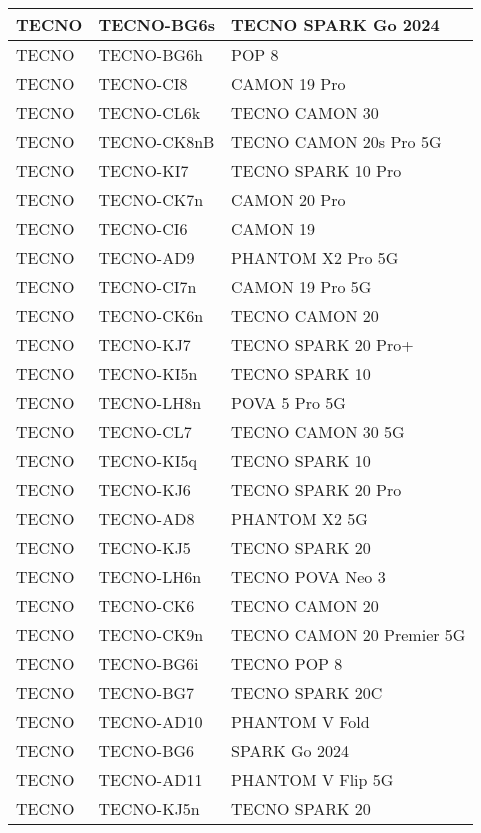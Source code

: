 \begin{tabularx}{\linewidth}{|l|X|X|}
        TECNO & TECNO-BG6s & TECNO SPARK Go 2024 \\ \hline
        TECNO & TECNO-BG6h & POP 8 \\ \hline
        TECNO & TECNO-CI8 & CAMON 19 Pro \\ \hline
        TECNO & TECNO-CL6k & TECNO CAMON 30 \\ \hline
        TECNO & TECNO-CK8nB & TECNO CAMON 20s Pro 5G \\ \hline
        TECNO & TECNO-KI7 & TECNO SPARK 10 Pro \\ \hline
        TECNO & TECNO-CK7n & CAMON 20 Pro \\ \hline
        TECNO & TECNO-CI6 & CAMON 19 \\ \hline
        TECNO & TECNO-AD9 & PHANTOM X2 Pro 5G \\ \hline
        TECNO & TECNO-CI7n & CAMON 19 Pro 5G \\ \hline
        TECNO & TECNO-CK6n & TECNO CAMON 20 \\ \hline
        TECNO & TECNO-KJ7 & TECNO SPARK 20 Pro+ \\ \hline
        TECNO & TECNO-KI5n & TECNO SPARK 10 \\ \hline
        TECNO & TECNO-LH8n & POVA 5 Pro 5G \\ \hline
        TECNO & TECNO-CL7 & TECNO CAMON 30 5G \\ \hline
        TECNO & TECNO-KI5q & TECNO SPARK 10 \\ \hline
        TECNO & TECNO-KJ6 & TECNO SPARK 20 Pro \\ \hline
        TECNO & TECNO-AD8 & PHANTOM X2 5G \\ \hline
        TECNO & TECNO-KJ5 & TECNO SPARK 20 \\ \hline
        TECNO & TECNO-LH6n & TECNO POVA Neo 3 \\ \hline
        TECNO & TECNO-CK6 & TECNO CAMON 20 \\ \hline
        TECNO & TECNO-CK9n & TECNO CAMON 20 Premier 5G \\ \hline
        TECNO & TECNO-BG6i & TECNO POP 8 \\ \hline
        TECNO & TECNO-BG7 & TECNO SPARK 20C \\ \hline
        TECNO & TECNO-AD10 & PHANTOM V Fold \\ \hline
        TECNO & TECNO-BG6 & SPARK Go 2024 \\ \hline
        TECNO & TECNO-AD11 & PHANTOM V Flip 5G \\ \hline
        TECNO & TECNO-KJ5n & TECNO SPARK 20 \\ \hline

\end{tabularx}
